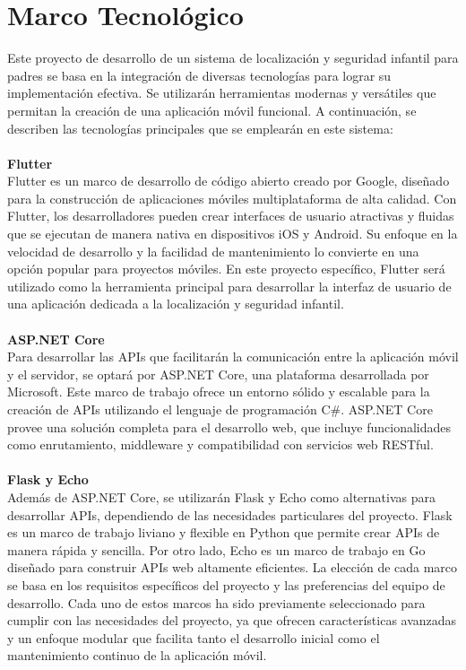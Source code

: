 \documentclass[12pt,onehalfspacing]{report}
\begin{document}
\section{Marco Tecnológico }
Este proyecto de desarrollo de un sistema de localización y seguridad infantil para padres se basa en la integración de diversas tecnologías para lograr su implementación efectiva. Se utilizarán herramientas modernas y versátiles que permitan la creación de una aplicación móvil funcional. A continuación, se describen las tecnologías principales que se emplearán en este sistema:\\\\
\textbf{Flutter}\\
Flutter es un marco de desarrollo de código abierto creado por Google, diseñado para la construcción de aplicaciones móviles multiplataforma de alta calidad. Con Flutter, los desarrolladores pueden crear interfaces de usuario atractivas y fluidas que se ejecutan de manera nativa en dispositivos iOS y Android. Su enfoque en la velocidad de desarrollo y la facilidad de mantenimiento lo convierte en una opción popular para proyectos móviles. En este proyecto específico, Flutter será utilizado como la herramienta principal para desarrollar la interfaz de usuario de una aplicación dedicada a la localización y seguridad infantil.\\\\
\textbf{ASP.NET Core}\\
Para desarrollar las APIs que facilitarán la comunicación entre la aplicación móvil y el servidor, se optará por ASP.NET Core, una plataforma desarrollada por Microsoft. Este marco de trabajo ofrece un entorno sólido y escalable para la creación de APIs utilizando el lenguaje de programación C#. ASP.NET Core provee una solución completa para el desarrollo web, que incluye funcionalidades como enrutamiento, middleware y compatibilidad con servicios web RESTful.\\\\
\textbf{Flask y Echo}\\
Además de ASP.NET Core, se utilizarán Flask y Echo como alternativas para desarrollar APIs, dependiendo de las necesidades particulares del proyecto. Flask es un marco de trabajo liviano y flexible en Python que permite crear APIs de manera rápida y sencilla. Por otro lado, Echo es un marco de trabajo en Go diseñado para construir APIs web altamente eficientes. La elección de cada marco se basa en los requisitos específicos del proyecto y las preferencias del equipo de desarrollo. Cada uno de estos marcos ha sido previamente seleccionado para cumplir con las necesidades del proyecto, ya que ofrecen características avanzadas y un enfoque modular que facilita tanto el desarrollo inicial como el mantenimiento continuo de la aplicación móvil.
\end{document}
